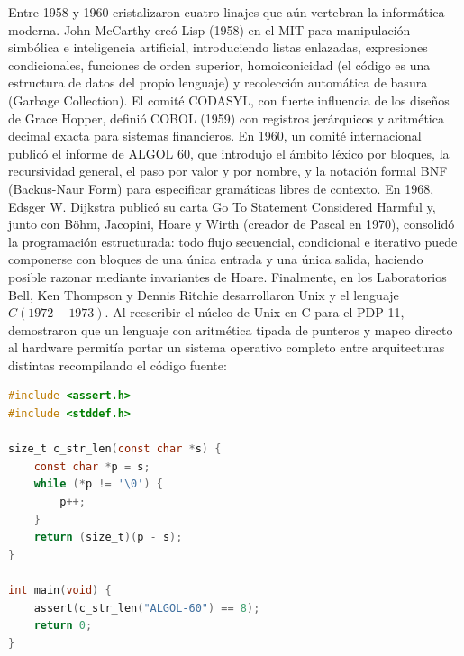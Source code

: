 \documentclass{book}
\begin{document}
Entre 1958 y 1960 cristalizaron cuatro linajes que aún vertebran la informática moderna. John McCarthy creó Lisp (1958) en el MIT para manipulación simbólica e inteligencia artificial, introduciendo listas enlazadas, expresiones condicionales, funciones de orden superior, homoiconicidad (el código es una estructura de datos del propio lenguaje) y recolección automática de basura (Garbage Collection). El comité CODASYL, con fuerte influencia de los diseños de Grace Hopper, definió COBOL (1959) con registros jerárquicos y aritmética decimal exacta para sistemas financieros. En 1960, un comité internacional publicó el informe de ALGOL 60, que introdujo el ámbito léxico por bloques, la recursividad general, el paso por valor y por nombre, y la notación formal BNF (Backus-Naur Form) para especificar gramáticas libres de contexto.
En 1968, Edsger W. Dijkstra publicó su carta Go To Statement Considered Harmful y, junto con Böhm, Jacopini, Hoare y Wirth (creador de Pascal en 1970), consolidó la programación estructurada: todo flujo secuencial, condicional e iterativo puede componerse con bloques de una única entrada y una única salida, haciendo posible razonar mediante invariantes de Hoare. Finalmente, en los Laboratorios Bell, Ken Thompson y Dennis Ritchie desarrollaron Unix y el lenguaje \(C (1972-1973)\). Al reescribir el núcleo de Unix en C para el PDP-11, demostraron que un lenguaje con aritmética tipada de punteros y mapeo directo al hardware permitía portar un sistema operativo completo entre arquitecturas distintas recompilando el código fuente:
\begin{lstlisting}[style=studium,language={C}]
#include <assert.h>
#include <stddef.h>

size_t c_str_len(const char *s) {
    const char *p = s;
    while (*p != '\0') {
        p++;
    }
    return (size_t)(p - s);
}

int main(void) {
    assert(c_str_len("ALGOL-60") == 8);
    return 0;
}
\end{lstlisting}
\end{document}
